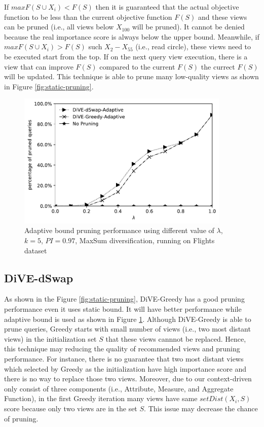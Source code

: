 \documentclass{article}
\begin{document}
If $ maxF(S \cup X_i) < F(S) $ then it is guaranteed that the actual objective function to be less than the current objective function $ F(S) $ and these views can be pruned (i.e., all views below $X_{100}$ will be pruned). It cannot be denied because the real importance score is always below the upper bound. Meanwhile, if $ maxF(S \cup X_i) > F(S) $ such $X_2 - X_{55}$ (i.e., read circle), these views need to be executed start from the top. If on the next query view execution, there is a view that can improve $ F(S) $ compared to the current $  F(S) $ the currect $F(S)$ will be updated. This technique is able to prune many low-quality views as shown in Figure \ref{fig:static-pruning}.
\begin{figure}
	\begin{center}
		\includegraphics[width=4.0in]{figures/pruning_performance_greedy_dswap_adaptive}
		\vspace{-12pt}
		\caption{Adaptive bound pruning performance using different value of $ \lambda $, $k = 5$,  $ PI = 0.97 $, MaxSum diversification, running on Flights dataset}
		\label{fig:adaptive-pruning-performance}
		
	\end{center}
\end{figure}
\subsection{DiVE-dSwap}
As shown in the Figure \ref{fig:static-pruning}, DiVE-Greedy has a good pruning performance even it uses static bound. It will have better performance while adaptive bound is used as shown in Figure \ref{fig:adaptive-pruning-performance}. Although DiVE-Greedy is able to prune queries, Greedy starts with small number of views (i.e., two most distant views) in the initialization set $S$ that these views cannnot be replaced. Hence, this technique may reducing the quality of recommended views and pruning performance. For instance, there is no guarantee that two most distant views which selected by Greedy as the initialization have high importance score and there is no way to replace those two views. Moreover, due to our context-driven only consist of three components (i.e., Attribute, Measure, and Aggregate Function), in the first Greedy iteration many views have same $ setDist(X_i, S) $ score because only two views are in the set $S$. This issue may decrease the chance of pruning.
\end{document}
